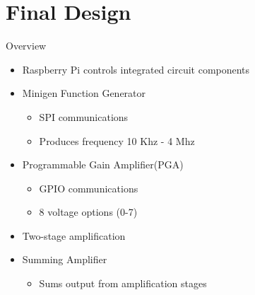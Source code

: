 
\section{Final Design}

\begin{frame}{Overview}
\begin{block}{}
  \begin{itemize}
    \item Raspberry Pi controls integrated circuit components
    \item Minigen Function Generator
    \begin{itemize}
      \item SPI communications
      \item Produces frequency 10 Khz - 4 Mhz
    \end{itemize}
     \item Programmable Gain Amplifier(PGA)
    \begin{itemize}
      \item GPIO communications
      \item 8 voltage options (0-7)
    \end{itemize}
    \item Two-stage amplification
    \item Summing Amplifier
    \begin{itemize}
      \item Sums output from amplification stages
    \end{itemize}
  \end{itemize}
\end{block}
\end{frame}

